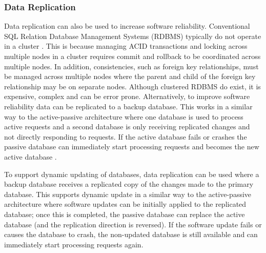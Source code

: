 \documentclass[a4paper,11pt,twoside]{article}
\begin{document}
\subsubsection{Data Replication}
Data replication can also be used to increase software reliability. Conventional SQL Relation Database Management Systems (RDBMS) typically do not operate in a cluster \cite{Replication}. This is because managing ACID transactions and locking across multiple nodes in a cluster requires commit and rollback to be coordinated across multiple nodes. In addition, consistencies, such as foreign key relationships, must be managed across multiple nodes where the parent and child of the foreign key relationship may be on separate nodes. Although clustered RDBMS do exist, it is expensive, complex and can be error prone. Alternatively, to improve software reliability data can be replicated to a backup database. This works in a similar way to the active-passive architecture where one database is used to process active requests and a second database is only receiving replicated changes and not directly responding to requests. If the active database fails or crashes the passive database can immediately start processing requests and becomes the new active database  \cite{Replication}.

To support dynamic updating of databases, data replication can be used where a backup database receives a replicated copy of the changes made to the primary database. This supports dynamic update in a similar way to the active-passive architecture where software updates can be initially applied to the replicated database; once this is completed, the passive database can replace the active database (and the replication direction is reversed). If the software update fails or causes the database to crash, the non-updated database is still available and can immediately start processing requests again.
\end{document}
